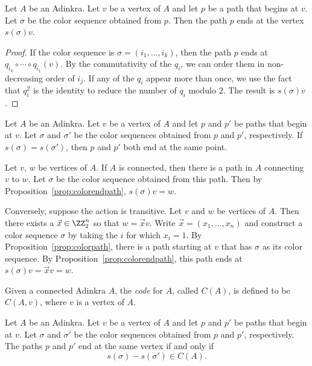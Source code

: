 \begin{prop}
\label{prop:colorendpath}
Let $A$ be an Adinkra.  Let $v$ be a vertex of $A$ and let $p$ be a path that begins at $v$.  Let $\sigma$ be the color sequence obtained from $p$.  Then the path $p$ ends at the vertex $s(\sigma)v$.
\end{prop}
\begin{proof}
If the color sequence is $\sigma=(i_1,\ldots,i_k)$, then the path $p$ ends at
$q_{i_k}\circ \cdots \circ q_{i_1}(v)$.  By the commutativity of the $q_i$, we can order them in non-decreasing order of $i_j$.  If any of the $q_i$ appear more than once, we use the fact that $q_i^2$ is the identity to reduce the number of $q_i$ modulo $2$.  The result is $s(\sigma)v$.
\end{proof}


\begin{cor}
\label{prop:pathands}
Let $A$ be an Adinkra.  Let $v$ be a vertex of $A$ and let $p$ and $p'$ be paths that begin at $v$.  Let $\sigma$ and $\sigma'$ be the color sequences obtained from $p$ and $p'$, respectively.  If $s(\sigma)=s(\sigma')$, then $p$ and $p'$ both end at the same point.
\end{cor}



Let $v$, $w$ be vertices of $A$.  If $A$ is connected, then there is a path in $A$ connecting $v$ to $w$.  Let $\sigma$ be the color sequence obtained from this path.  Then by Proposition~\ref{prop:colorendpath}, $s(\sigma)v=w$.

Conversely, suppose the action is transitive.  Let $v$ and $w$ be vertices of $A$.  Then there exists a $\vec{x}\in\ZZ_2^n$ so that $w=\vec{x}v$.  Write $\vec{x}=(x_1,\ldots,x_n)$ and construct a color sequence $\sigma$ by taking the $i$ for which $x_i=1$.  By Proposition~\ref{prop:colorpath}, there is a path starting at $v$ that has $\sigma$ as its color sequence.  By Proposition~\ref{prop:colorendpath}, this path ends at $s(\sigma)v=\vec{x}v=w$.



\begin{definition}
Given a connected Adinkra $A$, the \emph{code} for $A$, called $C(A)$, is defined to be $C(A,v)$, where $v$ is a vertex of $A$.
\end{definition}



\begin{prop}
\label{prop:paths}
Let $A$ be an Adinkra.  Let $v$ be a vertex of $A$ and let $p$ and $p'$ be paths that begin at $v$.  Let $\sigma$ and $\sigma'$ be the color sequences obtained from $p$ and $p'$, respectively.  The paths $p$ and $p'$ end at the same vertex if and only if 
\[s(\sigma)-s(\sigma')\in C(A).\]
\end{prop}

